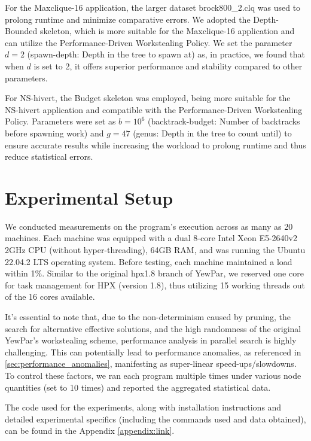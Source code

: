 \documentclass{mproj}
\begin{document}
For the Maxclique-16 application, the larger dataset brock800\_2.clq was used to prolong runtime and minimize comparative errors.
We adopted the Depth-Bounded skeleton, which is more suitable for the Maxclique-16 application and can utilize the Performance-Driven Workstealing Policy.
We set the parameter \(d = 2\) (spawn-depth: Depth in the tree to spawn at) as, in practice, we found that when \(d\) is set to 2, it offers superior performance and stability compared to other parameters.

For NS-hivert, the Budget skeleton was employed, being more suitable for the NS-hivert application and compatible with the Performance-Driven Workstealing Policy.
Parameters were set as \(b = 10^6\) (backtrack-budget: Number of backtracks before spawning work) and \(g = 47\) (genus: Depth in the tree to count until) to ensure accurate results while increasing the workload to prolong runtime and thus reduce statistical errors.

\section{Experimental Setup}

We conducted measurements on the program's execution across as many as 20 machines.
Each machine was equipped with a dual 8-core Intel Xeon E5-2640v2 2GHz CPU (without hyper-threading),
64GB RAM, and was running the Ubuntu 22.04.2 LTS operating system.
Before testing, each machine maintained a load within 1\%.
Similar to the original hpx1.8 branch of YewPar, we reserved one core for task management for HPX (version 1.8),
thus utilizing 15 working threads out of the 16 cores available.

It's essential to note that, due to the non-determinism caused by pruning, the search for alternative effective solutions, and the high randomness of the original YewPar's workstealing scheme,
performance analysis in parallel search is highly challenging.
This can potentially lead to performance anomalies, as referenced in \ref{sec:performance_anomalies},
manifesting as super-linear speed-ups/slowdowns.
To control these factors,
we ran each program multiple times under various node quantities (set to 10 times)
and reported the aggregated statistical data.

The code used for the experiments,
along with installation instructions and detailed experimental specifics (including the commands used and data obtained),
can be found in the Appendix \ref{appendix:link}.
\end{document}
